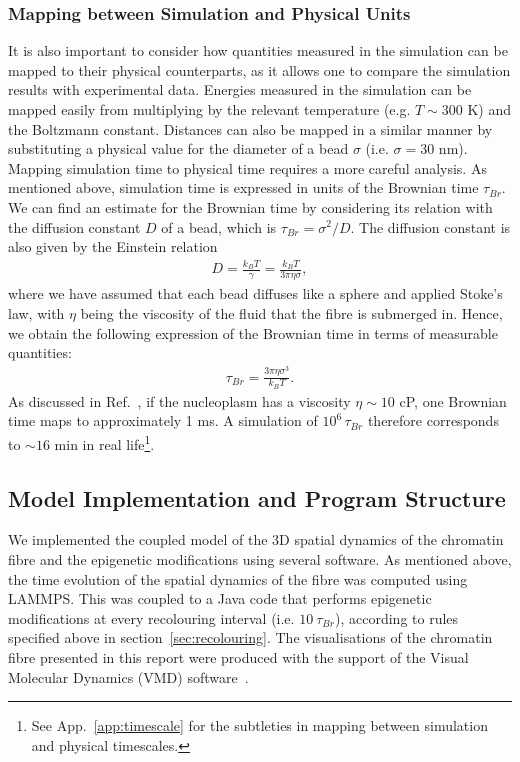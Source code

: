 \documentclass[12pt]{article}
\begin{document}
\subsubsection{Mapping between Simulation and Physical Units}
\label{sec:mapping}
It is also important to consider how quantities measured in the simulation can be mapped to their physical counterparts, as it allows one to compare the simulation results with experimental data. Energies measured in the simulation can be mapped easily from multiplying by the relevant temperature (e.g. $T \sim 300$ K) and the Boltzmann constant. Distances can also be mapped in a similar manner by substituting a physical value for the diameter of a bead $\sigma$ (i.e. $\sigma = 30$ nm). Mapping simulation time to physical time requires a more careful analysis. As mentioned above, simulation time is expressed in units of the Brownian time $\tau_{Br}$. We can find an estimate for the Brownian time by considering its relation with the diffusion constant $D$ of a bead, which is $\tau_{Br} = \sigma^2/D$. The diffusion constant is also given by the Einstein relation
\begin{eqnarray}
D = \frac{k_BT}{\gamma} = \frac{k_BT}{3\pi\eta\sigma},
\end{eqnarray}
where we have assumed that each bead diffuses like a sphere and applied Stoke's law, with $\eta$ being the viscosity of the fluid that the fibre is submerged in. Hence, we obtain the following expression of the Brownian time in terms of measurable quantities:
\begin{eqnarray}
\tau_{Br} = \frac{3\pi\eta\sigma^3}{k_BT}.
\end{eqnarray}
As discussed in Ref.~\cite{brackley2013}, if the nucleoplasm has a viscosity $\eta \sim 10$ cP, one Brownian time maps to approximately 1 ms. A simulation of $10^6\,\tau_{Br}$ therefore corresponds to $\sim16$ min in real life\footnote{See App.~\ref{app:timescale} for the subtleties in mapping between simulation and physical timescales.}.

\subsection{Model Implementation and Program Structure}
We implemented the coupled model of the 3D spatial dynamics of the chromatin fibre and the epigenetic modifications using several software. As mentioned above, the time evolution of the spatial dynamics of the fibre was computed using LAMMPS. This was coupled to a Java code that performs epigenetic modifications at every recolouring interval (i.e. $10~\tau_{Br}$), according to rules specified above in section~\ref{sec:recolouring}. The visualisations of the chromatin fibre presented in this report were produced with the support of the Visual Molecular Dynamics (VMD) software~\cite{humphrey1996}.
\end{document}
